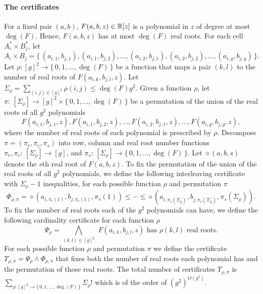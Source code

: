 \paragraph{The certificates}
For a fixed pair $(a,b)$, $F(a,b,z) \in \mathbb{R}[z]$ is a polynomial in $z$ of
degree at most $\deg(F)$. Hence, $F(a,b,z)$ has at most $\deg(F)$ real roots.
For each cell $A_i^* \times B_j^*$, let
\begin{displaymath}
	A_i\times B_j=\{\,
		(a_{i,1},b_{j,1}),
		(a_{i,1},b_{j,2}),
		\ldots,
		(a_{i,2},b_{j,1}),
		(a_{i,2},b_{j,2}),
		\ldots,
		(a_{i,g},b_{j,g})
	\,\}.
\end{displaymath}
Let $\rho
\colon {[g]}^2 \to \{\,0,1,\ldots,\deg(F)\,\}$ be a function that maps a pair $(k,l)$ to the
number of real roots of $F(a_{i,k},b_{j,l},z)$. Let $\Sigma_\rho = \sum_{(i,j)
\in {[g]}^2} \rho(i,j) \le \deg(F) g^2$.
Given a function $\rho$, let
$\pi\colon\,[\Sigma_\rho]\to {[g]}^2 \times
\{\,0,1,\ldots,\deg(F)\,\}$ be a permutation of the union of the real roots of all
$g^2$ polynomials
\begin{displaymath}
F(a_{i,1},b_{j,1},z),
F(a_{i,1},b_{j,2},z),
\ldots,
F(a_{i,2},b_{j,1},z),
\ldots,
F(a_{i,g},b_{j,g},z),
\end{displaymath}
where the number of real roots of each polynomial is
prescribed by $\rho$.
Decompose $\pi = (\pi_r,\pi_c,\pi_s)$ into
row,
column and real root number functions $\pi_r,\pi_c\colon\,[\Sigma_\rho]\to[g]$,
and $\pi_s\colon\,[\Sigma_\rho]\to\{\,0,1,\ldots,\deg(F)\,\}$.
Let $\diamond(a,b,s)$ denote the $s$th real root of $F(a,b,z)$.
To fix the permutation of the union of the real roots of all
$g^2$ polynomials, we define the following
interleaving certificate with $\Sigma_\rho - 1$ inequalities, for each possible
function $\rho$ and permutation $\pi$
\begin{displaymath}
	\Phi_{\rho,\pi} =
	\diamond(a_{i,\pi_r(1)},b_{j,\pi_c(1)},\pi_s(1))
	\le
	\cdots
	\le
	\diamond(a_{i,\pi_r(\Sigma_\rho)},b_{j,\pi_c(\Sigma_\rho)},\pi_s(\Sigma_\rho)).
\end{displaymath}
To fix the number of real roots each of the $g^2$ polynomials can have, we
define the following cardinality certificate for each function $\rho$
\begin{displaymath}
	\Psi_{\rho} =
	\bigwedge_{(k,l)\in{[g]}^2}\,\,
	F(a_{i,k},b_{j,l},z)\,\,\text{has $\rho(k,l)$ real roots}.
\end{displaymath}
For each possible function $\rho$ and permutation $\pi$ we define the
certificate $\Upsilon_{\rho,\pi} = \Psi_\rho \land \Phi_{\rho,\pi}$ that
fixes both the number of real roots each polynomial has and the permutation of
those real roots.
The total number of certificates $\Upsilon_{\rho,\pi}$ is
$\sum_{\rho\colon {[g]}^2 \to \{\,0,1,\ldots,\deg(F)\,\}} {\Sigma_\rho!}$
which is of the order of ${(g^2)}^{O(g^2)}$.

